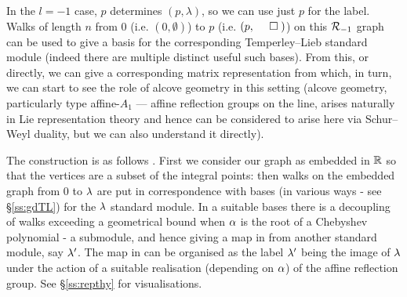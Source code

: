 \mdef 
{}
In the $l=-1$ case, $p$ determines $(p,\lambda)$, so we can use just $p$ for the label.
Walks of length $n$ from 0 (i.e. $(0,\emptyset)$) to $p$  (i.e. $(p,\!\!\!\!\qed\;)$)
on this ${\mathcal{R}}_{-1}$ graph can be used to give a basis for the corresponding 
Temperley--Lieb standard module (indeed there are multiple distinct useful such bases). 
From this, or directly, we can give a corresponding matrix representation from which, in turn, we can start to see the role of alcove geometry in this setting (alcove geometry, particularly type affine-$A_1$ --- affine reflection groups on the line, arises naturally in Lie representation theory and hence can be considered to arise here via Schur--Weyl duality, but we can also understand it directly). 

The construction is as follows  \cite{Martin91}. %
First we consider our graph as embedded in $\mathbb{R}$ so that the vertices are a subset of the integral points:
then walks on the embedded graph from 0 to $\lambda$ are put in correspondence with bases (in various ways - see \S\ref{ss:gdTL}) for the $\lambda$ standard module. 
In a suitable bases there is a decoupling of walks exceeding a geometrical bound when $\alpha$ is the root of a Chebyshev polynomial - a submodule, and hence giving a map in from another standard module, say $\lambda'$. The map in can be organised as the label $\lambda'$ being the image of $\lambda$ under the action of a suitable realisation (depending on $\alpha$) of the affine reflection group. See \S\ref{ss:repthy} for visualisations. 





%  
